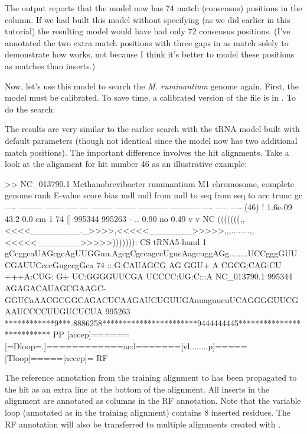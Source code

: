 The output reports that the model now has 74 match (consensus)
positions in the  column. If we had built this model
without specifying  (as we did earlier in this tutorial)
the resulting model would have had only 72 consensus positions.
(I've annotated the two extra match positions with three gaps in
 as match solely to demonstrate how
 works, not because I think it's better to model these
positions as matches than inserts.)

Now, let's use this model to search the \emph{M. ruminantium} genome
again. First, the model must be calibrated. To save time, a calibrated
version of the file is in . To do the
search:


The results are very similar to the earlier search with the
tRNA model built with default  parameters (though not
identical since the model now has two additional match positions). The
important difference involves the hit alignments. Take a look at the
alignment for hit number 46 as an illustrative example:

\begin{widesreoutput}
>> NC_013790.1  Methanobrevibacter ruminantium M1 chromosome, complete genome
 rank     E-value  score  bias mdl mdl from   mdl to       seq from      seq to       acc trunc   gc
 ----   --------- ------ ----- --- -------- --------    ----------- -----------      ---- ----- ----
 (46) !   1.6e-09   43.2   0.0  cm        1       74 []      995344      995263 - .. 0.90    no 0.49
                                 v          v                                                            NC
                     (((((((,,<<<<________._>>>>,<<<<<_______>>>>>,,,........,,<<<<<_______>>>>>))))))): CS
   tRNA5-hand      1 gCcggcaUAGcgcAgUUGGuu.AgcgCgccagccUgucAagcuggAGg........UCCgggGUUCGAUUCcccGugccgGca 74    
                     :::G:CAUAGCG AG  GGU+ A CGCG:CAG:CU +++A:CUG: G+        UC:GGGGUUCGA UCCCC:UG:C:::A
  NC_013790.1 995344 AGAGACAUAGCGAAGC-GGUCaAACGCGGCAGACUCAAGAUCUGUUGAuuaguucuUCAGGGGUUCGAAUCCCCUUGUCUCUA 995263
                     ************9***.8886258***********************9444444445************************** PP
                     [accep]======[=Dloop=.]============acd=======[vl........p]=====[Tloop]=====[accep]= RF
\end{widesreoutput}

The reference annotation from the training alignment to 
has been propagated to the hit as an extra  line at the
bottom of the alignment. All inserts in the alignment are annotated as
 columns in the RF annotation. Note that the variable loop
(annotated as \otext{[vlp]} in the training alignment) contains 8
inserted residues. The RF annotation will also be transferred to
multiple alignments created with .

